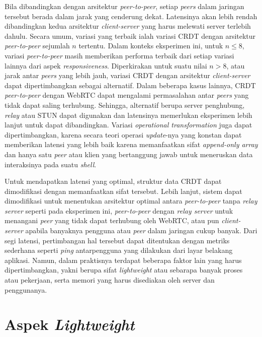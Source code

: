 Bila dibandingkan dengan arsitektur \textit{peer-to-peer}, setiap \textit{peers} dalam jaringan tersebut berada dalam jarak yang cenderung dekat. Latensinya akan lebih rendah dibandingkan kedua arsitektur \textit{client-server} yang harus melewati server terlebih dahulu. Secara umum, variasi yang terbaik ialah variasi CRDT dengan arsitektur \textit{peer-to-peer} sejumlah $n$ tertentu. Dalam konteks eksperimen ini, untuk $n \leq 8$, variasi \textit{peer-to-peer} masih memberikan performa terbaik dari setiap variasi lainnya dari aspek \textit{responsiveness}. Diperkirakan untuk suatu nilai $n > 8$, atau jarak antar \textit{peers} yang lebih jauh, variasi CRDT dengan arsitektur \textit{client-server} dapat dipertimbangkan sebagai alternatif. Dalam beberapa kasus lainnya, CRDT \textit{peer-to-peer} dengan WebRTC dapat mengalami permasalahan antar \textit{peers} yang tidak dapat saling terhubung. Sehingga, alternatif berupa server penghubung, \textit{relay} atau STUN dapat digunakan dan latensinya memerlukan eksperimen lebih lanjut untuk dapat dibandingkan. Variasi \textit{operational transformation} juga dapat dipertimbangkan, karena secara teori operasi \textit{update}-nya yang konstan dapat memberikan latensi yang lebih baik karena memanfaatkan sifat \textit{append-only array} dan hanya satu \textit{peer} atau klien yang bertanggung jawab untuk meneruskan data interaksinya pada suatu \textit{shell}.

Untuk mendapatkan latensi yang optimal, struktur data CRDT dapat dimodifikasi dengan memanfaatkan sifat tersebut. Lebih lanjut, sistem dapat dimodifikasi untuk menentukan arsitektur optimal antara \textit{peer-to-peer} tanpa \textit{relay server} seperti pada eksperimen ini, \textit{peer-to-peer} dengan \textit{relay server} untuk menangani \textit{peer} yang tidak dapat terhubung oleh WebRTC, atau pun \textit{client-server} apabila banyaknya pengguna atau \textit{peer} dalam jaringan cukup banyak. Dari segi latensi, pertimbangan hal tersebut dapat ditentukan dengan metriks sederhana seperti \textit{ping} antarpengguna yang dilakukan dari layar belakang aplikasi. Namun, dalam praktisnya terdapat beberapa faktor lain yang harus dipertimbangkan, yakni berupa sifat \textit{lightweight} atau sebarapa banyak proses atau pekerjaan, serta memori yang harus disediakan oleh server dan penggunanya.

\section{Aspek \textit{Lightweight}}

